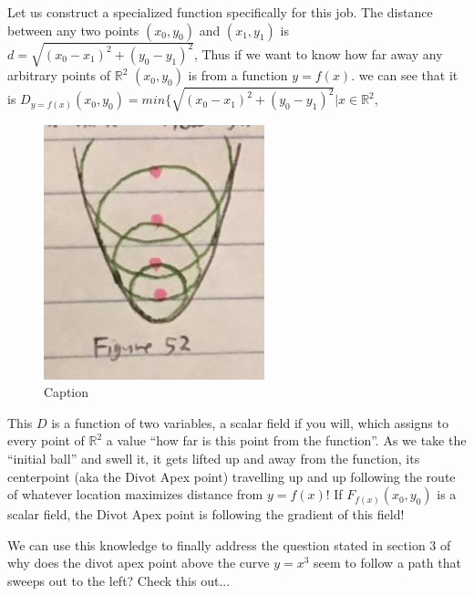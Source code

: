 Let us construct a specialized function specifically for this job. The distance between any two points $(x_0, y_0)$ and $(x_1, y_1)$ is $d = \sqrt{ (x_0 - x_1)^2 + (y_0 - y_1)^2 }$, Thus if we want to know how far away any arbitrary points of $\mathbb{R}^2$ $(x_0, y_0)$ is from a function $y = f(x)$. we can see that it is $D_{y = f(x)}(x_0, y_0) = min \{ \sqrt{ (x_0 - x_1)^2 + (y_0 - y_1)^2 } | x \in \mathbb{R}^2$,

\renewcommand\w{0.25\textwidth}
\renewcommand\fw{0.9\linewidth}

\begin{figure}
  \label{divot:13}
  \includegraphics[width=\fw]{img/12-divot/13.png}
  \caption{Caption}
\end{figure}

This $D$ is a function of two variables, a scalar field if you will, which assigns to every point of $\mathbb{R}^2$ a value ``how far is this point from the function''. As we take the ``initial ball'' and swell it, it gets lifted up and away from the function, its centerpoint (aka the Divot Apex point) travelling up and up following the route of whatever location maximizes distance from $y = f(x)$! If $F_{f(x)} (x_0, y_0)$ is a scalar field, the Divot Apex point is following the gradient of this field!

We can use this knowledge to finally address the question stated in section 3 of why does the divot apex point above the curve $y = x^3$ seem to follow a path that sweeps out to the left? Check this out...

\renewcommand\w{0.25\textwidth}
\renewcommand\fw{0.9\linewidth}

